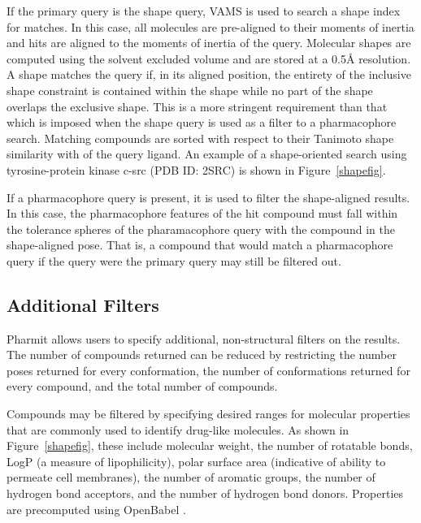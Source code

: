 If the primary query is the shape query, VAMS \cite{vams} is used to search a shape index \cite{matchpack} for matches.  In this case, all molecules are pre-aligned to their moments of inertia and hits are aligned to the moments of inertia of the query.  Molecular shapes are computed using the solvent excluded volume and are stored at a 0.5{\AA} resolution. A shape matches the query if, in its aligned position, the entirety of the inclusive shape constraint is contained within the shape while no part of the shape overlaps the exclusive shape.  This is a more stringent requirement than that which is imposed when the shape query is used as a filter to a pharmacophore search.
Matching compounds are sorted with respect to their Tanimoto shape similarity with of the query ligand. An example of a shape-oriented search using tyrosine-protein kinase c-src (PDB ID: 2SRC) is shown in Figure~\ref{shapefig}.

If a pharmacophore query is present, it is used to filter the shape-aligned results. In this case, the pharmacophore features of the hit compound must fall within the tolerance spheres of the pharamacophore query with the compound in the shape-aligned pose. That is, a compound that would match a pharmacophore query if the query were the primary query may still be filtered out.
 
\subsection{Additional Filters}
Pharmit allows users to specify additional, non-structural filters on the results. The number of compounds returned can be reduced by restricting the number poses returned for every conformation, the number of conformations returned for every compound, and the total number of compounds.

Compounds may be filtered by specifying desired ranges for molecular properties that are commonly used to identify drug-like molecules.
As shown in Figure~\ref{shapefig}, these include molecular weight, the number of rotatable bonds, LogP (a measure of lipophilicity), polar surface area (indicative of ability to permeate cell membranes), the number of aromatic groups, the number of hydrogen bond acceptors, and the number of hydrogen bond donors.  Properties are precomputed using OpenBabel \cite{O_Boyle_2011}.

